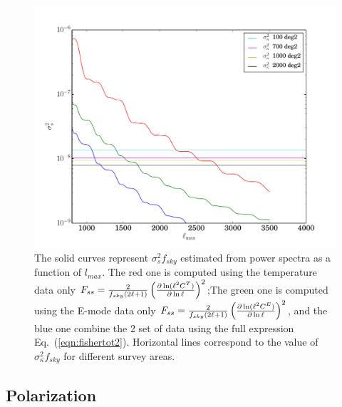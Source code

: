 \documentclass[prd,onecolumn,amsmath,amssymb,floatfix,superscriptaddress,notitlepage]{revtex4-1}
\newcommand{\refeq}[1]{Eq.~(\ref{eqn:#1})}
\begin{document}
\begin{figure}[htbp]
\begin{center}
\includegraphics[scale=0.6]{./Images/variancecompare.pdf}
\caption{The solid curves represent $\sigma_{s}^{2}f_{sky}$ estimated from power spectra as a function of $l_{max}$. 
The red one is computed using the temperature data only $F_{ss} = {2 \over f_{sky}(2\ell+1)} \left(\frac{\partial \ln(\ell^{2}C^{T})}{\partial \ln\ell}\right)^{2}$;The green one is computed using the E-mode data only $F_{ss} = {2 \over f_{sky}(2\ell+1)} \left(\frac{\partial \ln(\ell^{2}C^{E})}{\partial \ln\ell}\right)^{2}$, and the blue one combine the 2 set of data using the full expression \refeq{fishertot2}.
Horizontal lines  correspond to the value of $\sigma_{\kappa}^{2}f_{sky}$ for different survey areas.}
\label{fig:comparison}
\end{center}
\end{figure}



\subsection{Polarization}
\end{document}
